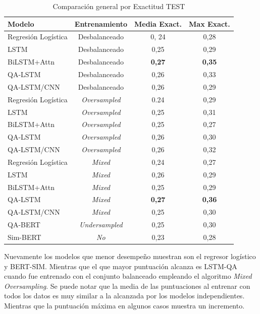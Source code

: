 \begin{table}[!tb]
  \begin{center}
    \caption{Comparación general por Exactitud TEST}
    \begin{tabular}{l|c|c|c}
      \textbf{Modelo} & \textbf{Entrenamiento} & \textbf{Media Exact.} & \textbf{Max Exact.}\\
      \hline
      Regresión Logística & Desbalanceado & 0, 24 & 0,28\\
      LSTM & Desbalanceado & 0,25 & 0,29 \\
      BiLSTM+Attn & Desbalanceado & \textbf{0,27} & \textbf{0,35} \\
      QA-LSTM & Desbalanceado & 0,26 & 0,33 \\
      QA-LSTM/CNN & Desbalanceado & 0,26 & 0,29 \\

      Regresión Logística & \textit{Oversampled} & 0.24 & 0,29 \\
      LSTM & \textit{Oversampled} & 0,25 & 0,31 \\
      BiLSTM+Attn & \textit{Oversampled} & 0,25 & 0,27 \\
      QA-LSTM & \textit{Oversampled} & 0,26 & 0,30 \\
      QA-LSTM/CNN & \textit{Oversampled} & 0,26 & 0,32 \\

      Regresión Logística & \textit{Mixed} & 0,24 & 0,27 \\
      LSTM & \textit{Mixed} & 0,26 & 0,29 \\
      BiLSTM+Attn & \textit{Mixed} & 0,25 & 0,29 \\
      QA-LSTM & \textit{Mixed} & \textbf{0,27} & \textbf{0,36} \\
      QA-LSTM/CNN & \textit{Mixed} & 0,25 & 0,30 \\

      QA-BERT & \textit{Undersampled} & 0,25 & 0,30 \\
      Sim-BERT & \textit{No} & 0,23 & 0,28 \\
      
    \end{tabular}
  \end{center}
  \label{comparison_acc_general}
\end{table}

Nuevamente los modelos que menor desempeño muestran son el regresor logístico y BERT-SIM. Mientras que el que mayor puntuación alcanza es LSTM-QA cuando fue entrenado con el conjunto balanceado empleando el algoritmo \textit{Mixed Oversampling}. Se puede notar que la media de las puntuaciones al entrenar con todos los datos es muy similar a la alcanzada por los modelos independientes. Mientras que la puntuación máxima en algunos casos muestra un incremento.

